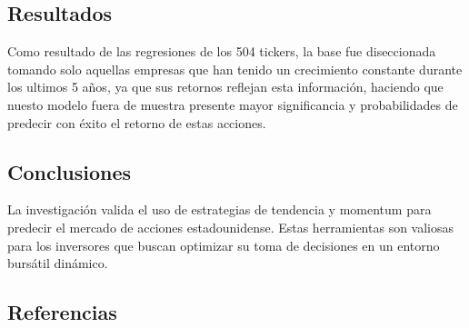 \documentclass[a0,portrait]{a0poster}
\newcommand{\customsection}[1]{
    \begin{center}
        \begin{tcolorbox}[colframe=miRojo!50, colback=miRojo, width=\linewidth, boxrule=1mm, arc=3mm, auto outer arc]
            \centering
            \vspace{.5cm} %
            \color{white}
            \section*{ \textbf{\Huge #1}}  %
            \vspace{.2cm} %
        \end{tcolorbox}
    \end{center}
}
\begin{document}
\begin{multicols}{2}
                
                
    \customsection{Resultados}
    \par 
     \normalsize
    Como resultado de las regresiones de los 504 tickers, la base fue diseccionada tomando solo aquellas empresas 
    que han tenido un crecimiento constante durante los ultimos 5 años, ya que sus retornos reflejan esta información, 
    haciendo que nuesto modelo fuera de muestra presente mayor significancia y probabilidades de predecir con éxito el 
    retorno de estas acciones.
    

    \vspace{1cm}

    \customsection{Conclusiones}
    \par
    \indent La investigación valida el uso de estrategias de tendencia y momentum para predecir el mercado de acciones 
    estadounidense. Estas herramientas son valiosas para los inversores que buscan optimizar su toma de decisiones en un 
    entorno bursátil dinámico. 
    \customsection{Referencias}
    \par

\end{multicols}
\end{document}
